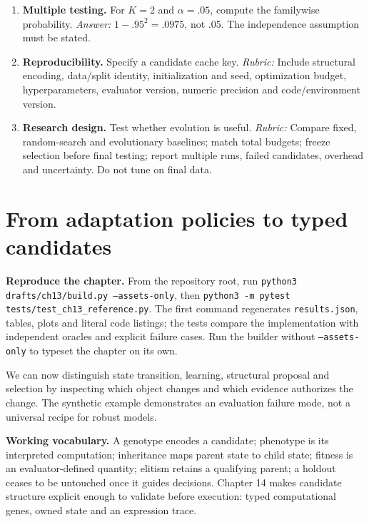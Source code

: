 \begin{enumerate}
\textit{Answer:} When the parent is included and all candidates are scored
deterministically under the same objective. Changed conditions invalidate
the comparison; noisy minima can improve without true quality improving.
\item \textbf{Multiple testing.} For $K=2$ and $\alpha=.05$, compute the
familywise probability. \textit{Answer:} $1-.95^2=.0975$,
not .05. The independence assumption must be stated.
\item \textbf{Reproducibility.} Specify a candidate cache key.
\textit{Rubric:} Include structural encoding, data/split identity,
initialization and seed, optimization budget, hyperparameters, evaluator
version, numeric precision and code/environment version.
\item \textbf{Research design.} Test whether evolution is useful.
\textit{Rubric:} Compare fixed, random-search and evolutionary baselines;
match total budgets; freeze selection before final testing; report multiple
runs, failed candidates, overhead and uncertainty. Do not tune on final data.
\end{enumerate}

\section{From adaptation policies to typed candidates}
\textbf{Reproduce the chapter.} From the repository root, run
\texttt{python3 drafts/ch13/build.py --assets-only}, then
\texttt{python3 -m pytest tests/test\_ch13\_reference.py}.
The first command regenerates \texttt{results.json}, tables, plots and literal
code listings; the tests compare the implementation with independent
oracles and explicit failure cases. Run the builder without
\texttt{--assets-only} to typeset the chapter on its own.

We can now distinguish state transition, learning, structural proposal and
selection by inspecting which object changes and which evidence authorizes
the change. The synthetic example demonstrates an evaluation failure mode,
not a universal recipe for robust models.

\textbf{Working vocabulary.} A genotype encodes a candidate; phenotype is
its interpreted computation; inheritance maps parent state to child state;
fitness is an evaluator-defined quantity; elitism retains a qualifying
parent; a holdout ceases to be untouched once it guides decisions.
Chapter 14 makes candidate structure explicit enough to validate before
execution: typed computational genes, owned state and an expression trace.
